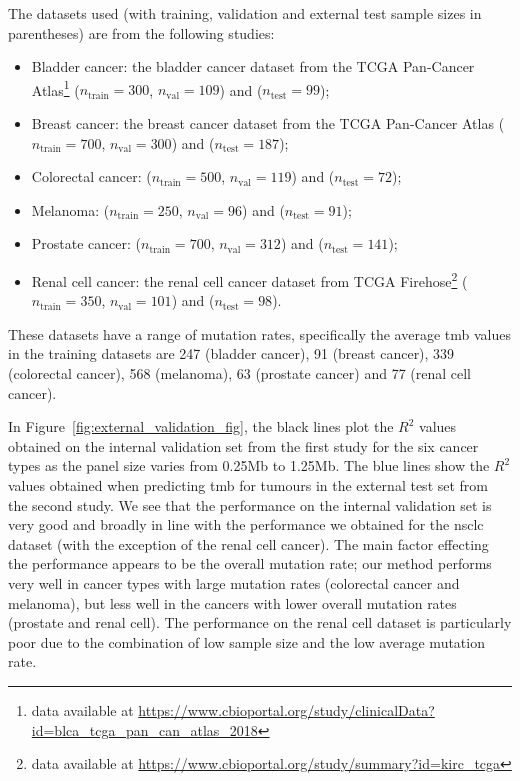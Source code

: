 \documentclass[../thesis.tex]{subfiles}
\begin{document}
{The datasets used (with training, validation and external test sample sizes in parentheses) are from the following studies:
\begin{itemize}
    \item Bladder cancer: the bladder cancer dataset from the TCGA Pan-Cancer Atlas\footnote{data available at \url{https://www.cbioportal.org/study/clinicalData?id=blca_tcga_pan_can_atlas_2018}} ($n_{\mathrm{train}} = 300$, $n_{\mathrm{val}} = 109$) and \citet{guo_whole-genome_2013} ($n_{\mathrm{test}} = 99$);
    \item Breast cancer: the breast cancer dataset from the TCGA Pan-Cancer Atlas ($n_{\mathrm{train}} = 700$, $n_{\mathrm{val}} = 300$) and \citet{kan_multi-omics_2018} ($n_{\mathrm{test}} = 187$);
    \item Colorectal cancer: \citet{giannakis_genomic_2016}  ($n_{\mathrm{train}} = 500$, $n_{\mathrm{val}} = 119$)  and \citet{seshagiri_recurrent_2012} ($n_{\mathrm{test}} = 72$);
    \item Melanoma: \citet{cancer_genome_atlas_network_genomic_2015} ($n_{\mathrm{train}} = 250$, $n_{\mathrm{val}} = 96$)  and \citet{krauthammer_exome_2012} ($n_{\mathrm{test}} = 91$);
    \item Prostate cancer: \citet{armenia_long_2018}  ($n_{\mathrm{train}} = 700$, $n_{\mathrm{val}} = 312$)  and \citet{kumar_substantial_2016} ($n_{\mathrm{test}} = 141$);
    \item Renal cell cancer: the renal cell cancer dataset from TCGA  Firehose\footnote{data available at  \url{https://www.cbioportal.org/study/summary?id=kirc_tcga}} ($n_{\mathrm{train}} = 350$, $n_{\mathrm{val}} = 101$)  and \citet{guo_frequent_2011} ($n_{\mathrm{test}} = 98$).
\end{itemize}   
These datasets have a range of mutation rates, specifically the average \gls{tmb} values in the training datasets are 247 (bladder cancer), 91 (breast cancer), 339 (colorectal cancer), 568 (melanoma), 63 (prostate cancer) and 77 (renal cell cancer).  }

{In Figure~\ref{fig:external_validation_fig}, the black lines plot the $R^2$ values obtained on the internal validation set from the first study for the six cancer types as the panel size varies from 0.25Mb to 1.25Mb. The blue lines show the $R^2$ values obtained when predicting \gls{tmb} for tumours in the external test set from the second study. We see that the performance on the internal validation set is very good and broadly in line with the performance we obtained for the \gls{nsclc} dataset (with the exception of the renal cell cancer). The main factor effecting the performance appears to be the overall mutation rate; our method performs very well in cancer types with large mutation rates (colorectal cancer and melanoma), but less well in the cancers with lower overall mutation rates (prostate and renal cell). The performance on the renal cell dataset is particularly poor due to the combination of low sample size and the low average mutation rate. }
\end{document}
